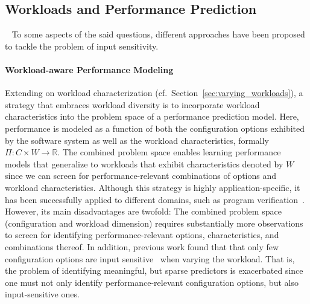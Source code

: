 \subsection{Workloads and Performance Prediction} ~\label{sec:strategies}
To some aspects of the said questions, different approaches have been proposed to tackle the problem of input sensitivity.

\paragraph{Workload-aware Performance Modeling}\label{sec:workload-aware}
Extending on workload characterization (cf.~Section~\ref{sec:varying_workloads}), a strategy that embraces workload diversity is to incorporate workload characteristics into the problem space of a performance prediction model. Here, performance is modeled as a function of both the configuration options exhibited by the software system as well as the workload characteristics, formally $\Pi: C \times W \rightarrow \mathbb{R}$.
The combined problem space enables learning performance models that generalize to workloads that exhibit characteristics denoted by $W$ since we can screen for performance-relevant combinations of options and workload characteristics. Although this strategy is highly application-specific, it has been successfully applied to different domains, such as program verification~\cite{koc_satune_2021}. However, its main disadvantages are twofold: The combined problem space (configuration and workload dimension) requires substantially more observations to screen for identifying performance-relevant options, characteristics, and combinations thereof. In addition, previous work  found that that only few configuration options are input sensitive~\cite{jamishidi_transfer_2017} when varying the workload. That is, the problem of identifying meaningful, but sparse predictors is exacerbated since one must not only identify performance-relevant configuration options, but also input-sensitive ones.


